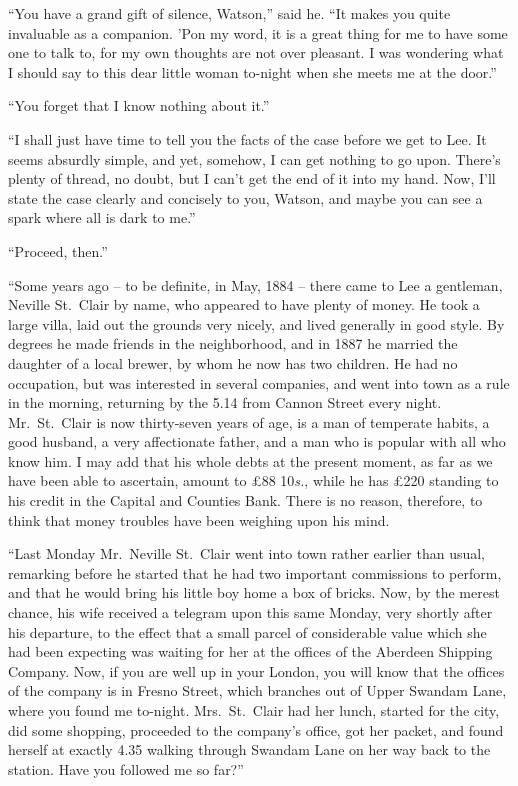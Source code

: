 “You have a grand gift of silence, Watson,” said he. “It
makes you quite invaluable as a companion. ’Pon my word,
it is a great thing for me to have some one to talk to, for my
own thoughts are not over pleasant. I was wondering what I
should say to this dear little woman to-night when she meets
me at the door.”

“You forget that I know nothing about it.”

“I shall just have time to tell you the facts of the case before
we get to Lee. It seems absurdly simple, and yet, somehow,
I can get nothing to go upon. There’s plenty of thread,
no doubt, but I can’t get the end of it into my hand. Now,
I’ll state the case clearly and concisely to you, Watson, and
maybe you can see a spark where all is dark to me.”

“Proceed, then.”

“Some years ago -- to be definite, in May, 1884 -- there came
to Lee a gentleman, Neville St.~Clair by name, who appeared
to have plenty of money. He took a large villa, laid out the
grounds very nicely, and lived generally in good style. By
degrees he made friends in the neighborhood, and in 1887 he
married the daughter of a local brewer, by whom he now has
two children. He had no occupation, but was interested in
several companies, and went into town as a rule in the morning,
returning by the 5.14 from Cannon Street every night.
Mr.~St.~Clair is now thirty-seven years of age, is a man of
temperate habits, a good husband, a very affectionate father,
and a man who is popular with all who know him. I may
add that his whole debts at the present moment, as far as we
have been able to ascertain, amount to £88 10\textit{s.}, while he
has £220 standing to his credit in the Capital and Counties
Bank. There is no reason, therefore, to think that money
troubles have been weighing upon his mind.

“Last Monday Mr.~Neville St.~Clair went into town rather
earlier than usual, remarking before he started that he had
two important commissions to perform, and that he would
bring his little boy home a box of bricks. Now, by the merest
chance, his wife received a telegram upon this same Monday,
very shortly after his departure, to the effect that a small parcel
of considerable value which she had been expecting was
waiting for her at the offices of the Aberdeen Shipping Company.
Now, if you are well up in your London, you will
know that the offices of the company is in Fresno Street,
which branches out of Upper Swandam Lane, where you
found me to-night. Mrs.~St.~Clair had her lunch, started for
the city, did some shopping, proceeded to the company’s office,
got her packet, and found herself at exactly 4.35 walking
through Swandam Lane on her way back to the station.
Have you followed me so far?”


